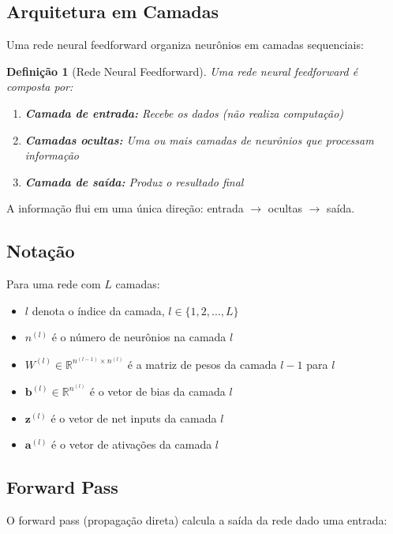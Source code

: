 \documentclass[a4paper,12pt]{article}
\newtheorem{definicao}{Definição}[section]
\begin{document}
\subsection{Arquitetura em Camadas}

Uma rede neural feedforward organiza neurônios em camadas sequenciais:

\begin{definicao}[Rede Neural Feedforward]
Uma rede neural feedforward é composta por:
\begin{enumerate}
    \item \textbf{Camada de entrada:} Recebe os dados (não realiza computação)
    \item \textbf{Camadas ocultas:} Uma ou mais camadas de neurônios que processam informação
    \item \textbf{Camada de saída:} Produz o resultado final
\end{enumerate}
\end{definicao}

A informação flui em uma única direção: entrada $\rightarrow$ ocultas $\rightarrow$ saída.

\subsection{Notação}

Para uma rede com $L$ camadas:
\begin{itemize}
    \item $l$ denota o índice da camada, $l \in \{1, 2, ..., L\}$
    \item $n^{(l)}$ é o número de neurônios na camada $l$
    \item $W^{(l)} \in \mathbb{R}^{n^{(l-1)} \times n^{(l)}}$ é a matriz de pesos da camada $l-1$ para $l$
    \item $\mathbf{b}^{(l)} \in \mathbb{R}^{n^{(l)}}$ é o vetor de bias da camada $l$
    \item $\mathbf{z}^{(l)}$ é o vetor de net inputs da camada $l$
    \item $\mathbf{a}^{(l)}$ é o vetor de ativações da camada $l$
\end{itemize}

\subsection{Forward Pass}

O forward pass (propagação direta) calcula a saída da rede dado uma entrada:
\end{document}
